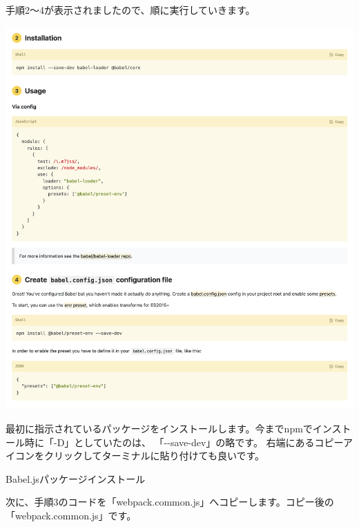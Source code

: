 手順2〜4が表示されましたので、順に実行していきます。

\begin{reviewimage}[H]%
\includegraphics[width=0.9\maxwidth]{./images/02-create-react-app/babel03.png}%
\label{image:02-create-react-app:babel03}
\end{reviewimage}

\clearpage


最初に指示されているパッケージをインストールします。今までnpmでインストール時に「{-}D」としていたのは、
「{-}{-}save{-}dev」の略です。
右端にあるコピーアイコンをクリックしてターミナルに貼り付けても良いです。

\def\startercodeblockfontsize{}
\begin{starterterminal}[]{Babel.jsパッケージインストール}\end{starterterminal}

次に、手順3のコードを「webpack.common.js」へコピーします。コピー後の「webpack.common.js」です。

